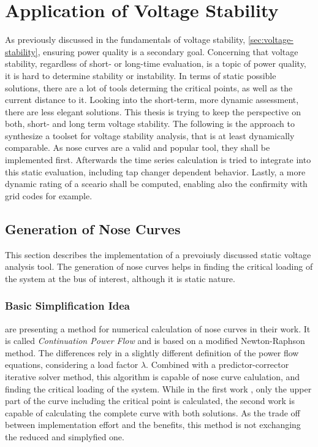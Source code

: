 \section{Application of Voltage Stability}
\label{sec:application-voltage-stability}

As previously discussed in the fundamentals of voltage stability, \autoref{sec:voltage-stability}, ensuring power quality is a secondary goal.
Concerning that voltage stability, regardless of short- or long-time evaluation, is a topic of power quality, it is hard to determine stability or instability.
In terms of static possible solutions, there are a lot of tools determing the critical points, as well as the current distance to it.
Looking into the short-term, more dynamic assessment, there are less elegant solutions. 
This thesis is trying to keep the perspective on both, short- and long term voltage stability.
The following is the approach to synthesize a toolset for voltage stability analysis, that is at least dynamically comparable.
As nose curves are a valid and popular tool, they shall be implemented first. 
Afterwards the time series calculation is tried to integrate into this static evaluation, including tap changer dependent behavior.
Lastly, a more dynamic rating of a sceario shall be computed, enabling also the confirmity with grid codes for example.

\subsection{Generation of Nose Curves}
\label{sec:nose-curves}

This section describes the implementation of a prevoiusly discussed static voltage analysis tool.
The generation of nose curves helps in finding the critical loading of the system at the bus of interest, although it is static nature. 

\subsubsection{Basic Simplification Idea}

\textcite{ajjarapu_1992, ajjarapu_2007} are presenting a method for numerical calculation of nose curves in their work. 
It is called {\itshape Continuation Power Flow} and is based on a modified Newton-Raphson method.
The differences rely in a slightly different definition of the power flow equations, considering a load factor $\lambda$.
Combined with a predictor-corrector iterative solver method, this algorithm is capable of nose curve calulation, and finding the critical loading of the system.
While in the first work \autocite{ajjarapu_1992}, only the upper part of the curve including the critical point is calculated, the second work \autocite{ajjarapu_2007} is capable of calculating the complete curve with both solutions. 
As the trade off between implementation effort and the benefits, this method is not exchanging the reduced and simplyfied one.

